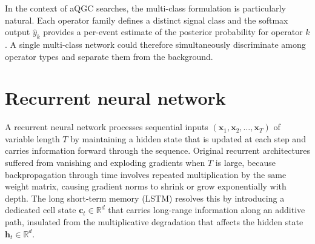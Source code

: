 In the context of aQGC searches, the multi-class formulation is particularly natural.  Each operator family defines a distinct signal class and the softmax output $\hat{y}_k$ provides a per-event estimate of the posterior probability for operator $k$.  A single multi-class network could therefore simultaneously discriminate among operator types and separate them from the background.

\section{Recurrent neural network}

A recurrent neural network processes sequential inputs $(\mathbf{x}_1,\mathbf{x}_2,\dots,\mathbf{x}_T)$ of variable length $T$ by maintaining a hidden state that is updated at each step and carries information forward through the sequence.  Original recurrent architectures suffered from vanishing and exploding gradients when $T$ is large, because backpropagation through time involves repeated multiplication by the same weight matrix, causing gradient norms to shrink or grow exponentially with depth.  The long short-term memory (LSTM) \cite{Hochreiter_LSTM_1997} resolves this by introducing a dedicated cell state $\mathbf{c}_t\in\mathbb{R}^{d}$ that carries long-range information along an additive path, insulated from the multiplicative degradation that affects the hidden state $\mathbf{h}_t\in\mathbb{R}^{d}$.


